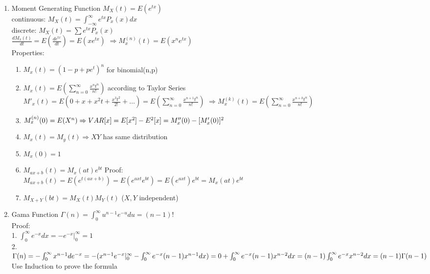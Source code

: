 \documentclass[10pt]{article}
\begin{document}
  
	\begin{multicols}{2}
		\begin{enumerate}
			\item Moment Generating Function
			$M_X(t) = E(e^{tx})$\\
			continuous: $M_X(t) = \int_{-\infty}^{\infty}e^{tx}P_x(x)dx$\\
			discrete: $M_X(t) = \sum e^{tx}P_x(x)$\\
			$\frac{dM_x(t)}{dt} = E(\frac{de^{tx}}{dt}) = E(xe^{tx})$
			$\Rightarrow M^{(n)}_x(t) = E(x^ne^{tx})$\\
			Properties:
			\begin{enumerate}
				\item $M_x(t) = (1-p+pe^t)^n$ for binomial(n,p)
				\item $M_x(t) = E(\sum_{n=0}^{\infty}\frac{x^nt^n}{n!})$ according to Taylor Series\\
				$M'_x(t) = E(0+x+x^2t + \frac{x^3t^2}{2!} + \dots) = E(\sum_{n=0}^{\infty}\frac{x^{n+1}t^n}{n!})$
				$\Rightarrow M^{(k)}_x(t) = E(\sum_{n=0}^{\infty}\frac{x^{n+k}t^n}{n!})$
				\item $M_x^{(n)}(0) = E(X^n) \\ \Rightarrow VAR[x]=E[x^2] - E^2[x] = M_x''(0) - [M_x'(0)]^2 $
				\item $M_x(t) = M_y(t) \Rightarrow X Y$ has same distribution
				\item $M_x(0) = 1$
				\item $M_{ax + b}(t) = M_x(at)e^{bt}$   Proof:\\ $M_{ax+b}(t) = E(e^{t(ax+b)}) = E(e^{axt}e^{bt}) = E(e^{axt})e^{bt} = M_x(at)e^{bt}$
				\item $M_{X+Y}(bt) = M_X(t)M_Y(t)$ ($X,Y$ independent)
			\end{enumerate}
		
			\item Gama Function
			$\Gamma(n) = \int_{0}^{\infty}u^{n-1}e^{-u}du = (n-1)!$\\
			Proof:\\
			1. $\int_{0}^{\infty}e^{-x}dx = -e^{-x}|_0^{\infty} = 1$\\
			2. $\Gamma(n) = -\int_{0}^{\infty}x^{n-1}de^{-x}\\
			= - (x^{n-1}e^{-x}|_0^{\infty} - \int_{0}^{\infty}e^{-x}(n-1)x^{n-1}dx)\\
			= 0 + \int_{0}^{\infty}e^{-x}(n-1)x^{n-2}dx\\
			= (n-1)\int_{0}^{\infty}e^{-x}x^{n-2}dx\\
			= (n-1)\Gamma(n-1)$\\
			Use Induction to prove the formula
			

\end{enumerate}
\end{multicols}
\end{document}
